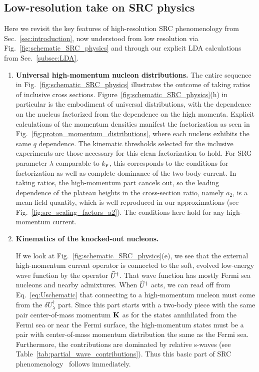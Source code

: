 \documentclass[10pt,aps,prc,floatfix,twocolumn,nofootinbib]{revtex4-1}
\begin{document}
\subsection{Low-resolution take on SRC physics}

Here we revisit the key features of high-resolution SRC phenomenology from Sec.~\ref{sec:introduction}, now understood from low resolution via Fig.~\ref{fig:schematic_SRC_physics} and through our explicit LDA calculations from Sec.~\ref{subsec:LDA}.
%
\begin{enumerate}
   \item \textbf{Universal high-momentum nucleon distributions.}
  The entire sequence in Fig.~\ref{fig:schematic_SRC_physics} illustrates the outcome of taking ratios of inclusive cross sections.
  Figure~\ref{fig:schematic_SRC_physics}(h) in particular is the embodiment of universal distributions, with the dependence on the nucleus factorized from the dependence on the high momenta.
  Explicit calculations of the momentum densities manifest the factorization as seen in Fig.~\ref{fig:proton_momentum_distributions}, where each nucleus exhibits the same $q$ dependence.
  The kinematic thresholds selected for the inclusive experiments are those necessary for this clean factorization to hold.
  For SRG parameter $\lambda$ comparable to $k_{\scriptscriptstyle{\text F}}$, this corresponds to the conditions for factorization as well as complete dominance of the two-body current.
  In taking ratios, the high-momentum part cancels out, so the leading dependence of the plateau heights in the cross-section ratio, namely $a_2$, is a mean-field quantity, which is well reproduced in our approximations (see Fig.~\ref{fig:src_scaling_factors_a2}).
  The conditions here hold for any high-momentum current.
  
  
   \item \textbf{Kinematics of the knocked-out nucleons.}

   If we look at Fig.~\ref{fig:schematic_SRC_physics}(e), we see that the external high-momentum current operator is connected to the soft, evolved low-energy wave function by the operator $\widehat U^\dagger$.
   That wave function has mostly Fermi sea nucleons and nearby admixtures.
   When $\widehat U^\dagger$ acts, we can read off from Eq.~\eqref{eq:Uschematic} that connecting to a high-momentum nucleon must come from the $\delta U_\lambda^\dagger$ part.
   Since this part starts with a two-body piece with the same pair center-of-mass momentum $\mathbf{K}$ as for the states annihilated from the Fermi sea or near the Fermi surface, the high-momentum states must be a pair with center-of-mass momentum distribution the same as the Fermi sea.
   Furthermore, the contributions are dominated by relative s-waves (see Table~\ref{tab:partial_wave_contributions}).
   Thus this basic part of SRC phenomenology~\cite{Cohen:2018gzh} follows immediately.
   

\end{enumerate}
\end{document}
